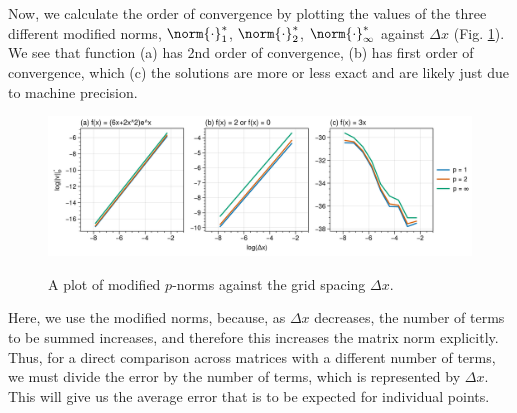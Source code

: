 Now, we calculate the order of convergence by plotting the values of the three different modified norms, $\norm{\cdot}_1^*$, $\norm{\cdot}_2^*$, $\norm{\cdot}_\infty^*$ against $\Delta x$ (Fig. \ref{hw2_qn3_pnorm}).  We see that function (a) has 2nd order of convergence, (b) has first order of convergence, which (c) the solutions are more or less exact and are likely just due to machine precision.

\begin{figure}[h!]
\centering
\includegraphics[width=\textwidth]{figures/hw2_qn3_pnorm.png}\\
\caption{A plot of modified $p$-norms against the grid spacing $\Delta x$.}
\label{hw2_qn3_pnorm}
\end{figure}

Here, we use the modified norms, because, as $\Delta x$ decreases, the number of terms to be summed increases, and therefore this increases the matrix norm explicitly.  Thus, for a direct comparison across matrices with a different number of terms, we must divide the error by the number of terms, which is represented by $\Delta x$.  This will give us the average error that is to be expected for individual points.